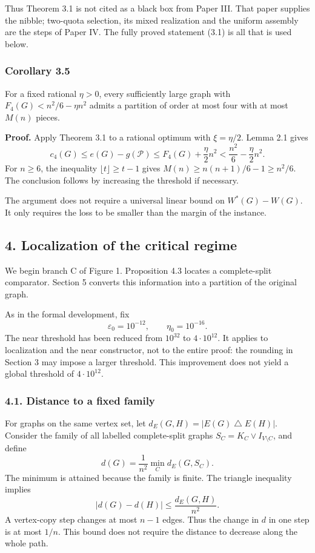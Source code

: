 \documentclass[english,11pt,a4paper]{article}
\begin{document}
Thus Theorem 3.1 is not cited as a black box from Paper III. That paper supplies the nibble; two-quota selection, its mixed realization and the uniform assembly are the steps of Paper IV. The fully proved statement (3.1) is all that is used below.

\subsubsection{Corollary 3.5}\label{corollary-3.5}

For a fixed rational \(\eta>0\), every sufficiently large graph with \(F_4(G)<n^2/6-\eta n^2\) admits a partition of order at most four with at most \(M(n)\) pieces.

\textbf{Proof.} Apply Theorem 3.1 to a rational optimum with \(\xi=\eta/2\). Lemma 2.1 gives \[
c_4(G)\le e(G)-g(\mathcal P)
\le F_4(G)+\frac\eta2n^2
<\frac{n^2}{6}-\frac\eta2n^2.
\] For \(n\ge6\), the inequality \(\lfloor t\rfloor\ge t-1\) gives \(M(n)\ge n(n+1)/6-1\ge n^2/6\). The conclusion follows by increasing the threshold if necessary.

The argument does not require a universal linear bound on \(W^*(G)-W(G)\). It only requires the loss to be smaller than the margin of the instance.

\subsection{4. Localization of the critical regime}\label{localization-of-the-critical-regime}

We begin branch C of Figure 1. Proposition 4.3 locates a complete-split comparator. Section 5 converts this information into a partition of the original graph.

As in the formal development, fix \[
\varepsilon_0=10^{-12},\qquad \eta_0=10^{-16}.
\tag{4.1}
\] The near threshold has been reduced from \(10^{32}\) to \(4\cdot10^{12}\). It applies to localization and the near constructor, not to the entire proof: the rounding in Section 3 may impose a larger threshold. This improvement does not yield a global threshold of \(4\cdot10^{12}\).

\subsubsection{4.1. Distance to a fixed family}\label{distance-to-a-fixed-family}

For graphs on the same vertex set, let \(d_E(G,H)=|E(G)\mathbin{\triangle}E(H)|\). Consider the family of all labelled complete-split graphs \(S_C=K_C\vee I_{V\setminus C}\), and define \[
d(G)=\frac1{n^2}\min_C d_E(G,S_C).
\] The minimum is attained because the family is finite. The triangle inequality implies \[
|d(G)-d(H)|\le\frac{d_E(G,H)}{n^2}.
\tag{4.2}
\] A vertex-copy step changes at most \(n-1\) edges. Thus the change in \(d\) in one step is at most \(1/n\). This bound does not require the distance to decrease along the whole path.
\end{document}
